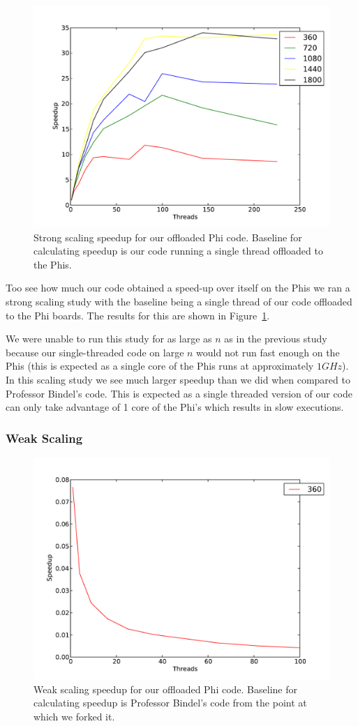 \begin{figure}[h!]
\centering
\includegraphics[width=0.5\linewidth]{mic_strong_mic_baseline.pdf}
\caption{Strong scaling speedup for our offloaded Phi code. Baseline for calculating speedup is our code running a single thread offloaded to the Phis.}
\label{fig:strong-mic-mic}
\end{figure}

Too see how much our code obtained a speed-up over itself on the Phis we ran a strong scaling study with the baseline being a single thread of our code offloaded to the Phi boards. The results for this are shown in Figure~\ref{fig:strong-mic-mic}.

We were unable to run this study for as large as $n$ as in the previous study because our single-threaded code on large $n$ would not run fast enough on the Phis (this is expected as a single core of the Phis runs at approximately $1GHz$). In this scaling study we see much larger speedup than we did when compared to Professor Bindel's code. This is expected as a single threaded version of our code can only take advantage of 1 core of the Phi's which results in slow executions.

\subsubsection{Weak Scaling}
\begin{figure}[h!]
\centering
\includegraphics[width=0.5\linewidth]{mic_weak_bindel_baseline.pdf}
\caption{Weak scaling speedup for our offloaded Phi code. Baseline for calculating speedup is Professor Bindel's code from the point at which we forked it.}
\label{fig:weak-mic}
\end{figure}

